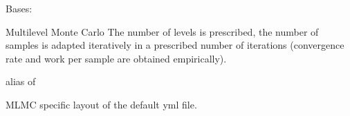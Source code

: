 \documentclass[letterpaper,10pt,english]{sphinxmanual}
\begin{document}
\begin{fulllineitems}
\label{\detokenize{uqmethod:uqmethod.mlmc.Mlmc}}
Bases: {\hyperref[\detokenize{uqmethod:uqmethod.uqmethod.UqMethod}]{}}

Multilevel Monte Carlo
The number of levels is prescribed, the number of samples is 
adapted iteratively in a prescribed number of iterations
(convergence rate and work per sample are obtained empirically).

\begin{fulllineitems}
\label{\detokenize{uqmethod:uqmethod.mlmc.Mlmc.SamplingMethod}}
alias of {\hyperref[\detokenize{sampling:sampling.sampling.MonteCarlo}]{}}

\end{fulllineitems}


\begin{fulllineitems}
\label{\detokenize{uqmethod:uqmethod.mlmc.Mlmc.default_yml}}
MLMC specific layout of the default yml file.

\end{fulllineitems}


\begin{fulllineitems}
\label{\detokenize{uqmethod:uqmethod.mlmc.Mlmc.defaults_}}
\end{fulllineitems}



\end{fulllineitems}
\end{document}
